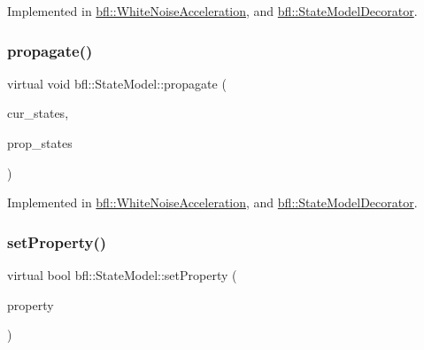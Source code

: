Implemented in \mbox{\hyperlink{classbfl_1_1WhiteNoiseAcceleration_addb79c08bdf08b89629bdcd24e46d1b8}{bfl\+::\+White\+Noise\+Acceleration}}, and \mbox{\hyperlink{classbfl_1_1StateModelDecorator_a0a645d8be4085ec13d9715a41c84a9b3}{bfl\+::\+State\+Model\+Decorator}}.

\mbox{\label{classbfl_1_1StateModel_a47a625abb7df9b7afa689ccb9aa11aee}} 
\subsubsection{\texorpdfstring{propagate()}{propagate()}}
{\footnotesize\ttfamily virtual void bfl\+::\+State\+Model\+::propagate (\begin{DoxyParamCaption}\item[{const Eigen\+::\+Ref$<$ const Eigen\+::\+Matrix\+Xf $>$ \&}]{cur\+\_\+states,  }\item[{Eigen\+::\+Ref$<$ Eigen\+::\+Matrix\+Xf $>$}]{prop\+\_\+states }\end{DoxyParamCaption})\hspace{0.3cm}{\ttfamily [pure virtual]}}



Implemented in \mbox{\hyperlink{classbfl_1_1WhiteNoiseAcceleration_a1c2f938f535c20c78447a69c76c6896b}{bfl\+::\+White\+Noise\+Acceleration}}, and \mbox{\hyperlink{classbfl_1_1StateModelDecorator_a3780afac5fc0e542cf4517c2057f9957}{bfl\+::\+State\+Model\+Decorator}}.

\mbox{\label{classbfl_1_1StateModel_ac86dcdad8f0bbfab39a23e592779feaa}} 
\subsubsection{\texorpdfstring{set\+Property()}{setProperty()}}
{\footnotesize\ttfamily virtual bool bfl\+::\+State\+Model\+::set\+Property (\begin{DoxyParamCaption}\item[{const std\+::string \&}]{property }\end{DoxyParamCaption})\hspace{0.3cm}{\ttfamily [pure virtual]}}



